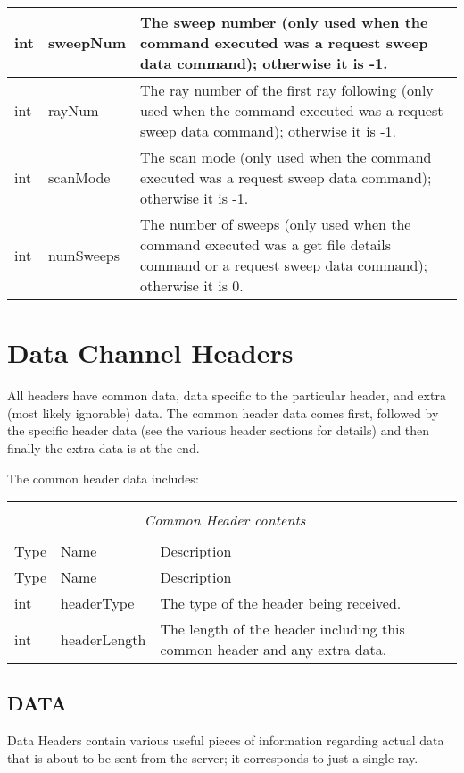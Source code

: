 \documentclass[10pt]{article}
\newcommand{\tblspc}{\rule{0pt}{3ex}}
\begin{document}
\begin{longtable}{|p{}|l|p{}|}
\hline
\tblspc int & sweepNum & The sweep number (only used when the command executed was a request sweep data command); otherwise it is -1. \\
\hline
\tblspc int & rayNum & The ray number of the first ray following (only used when the command executed was a request sweep data command); otherwise it is -1. \\
\hline
\tblspc int & scanMode & The scan mode (only used when the command executed was a request sweep data command); otherwise it is -1. \\
\hline
\tblspc int & numSweeps & The number of sweeps (only used when the command executed was a get file details command or a request sweep data command); otherwise it is 0. \\
\hline
\end{longtable}


\section{Data Channel Headers}
\label{sec:data_channel_headers}
All headers have common data, data specific to the particular header, and extra (most likely ignorable) data. The common header data comes first, followed by the specific header data (see the various header sections for details) and then finally the extra data is at the end.

The common header data includes:
\begin{longtable}{|p{}|l|p{}|p{}|}
\hline
\multicolumn{3}{|c|}{} \\
\multicolumn{3}{|c|}{\emph{Common Header contents}} \\
\multicolumn{3}{|c|}{} \\
\hline Type & Name & Description \\ \hline \endfirsthead
\hline Type & Name & Description \\ \hline \endhead
\hline \endfoot
\tblspc int & headerType & The type of the header being received. \\
\hline
\tblspc int & headerLength & The length of the header including this common header and any extra data. \\
\hline
\end{longtable}

\subsection{DATA}
\label{sec:data}
Data Headers contain various useful pieces of information regarding actual data that is about to be sent from the server; it corresponds to just a single ray.
\end{document}
